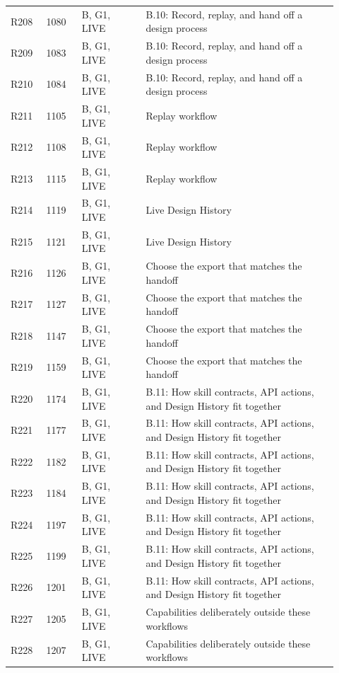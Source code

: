 \documentclass[11pt]{article}
\begin{document}
\begin{longtable}{@{}p{0.10\linewidth}p{0.10\linewidth}p{0.18\linewidth}p{0.54\linewidth}@{}}
R208 & 1080 & B, G1, LIVE & B.10: Record, replay, and hand off a design process \\
R209 & 1083 & B, G1, LIVE & B.10: Record, replay, and hand off a design process \\
R210 & 1084 & B, G1, LIVE & B.10: Record, replay, and hand off a design process \\
R211 & 1105 & B, G1, LIVE & Replay workflow \\
R212 & 1108 & B, G1, LIVE & Replay workflow \\
R213 & 1115 & B, G1, LIVE & Replay workflow \\
R214 & 1119 & B, G1, LIVE & Live Design History \\
R215 & 1121 & B, G1, LIVE & Live Design History \\
R216 & 1126 & B, G1, LIVE & Choose the export that matches the handoff \\
R217 & 1127 & B, G1, LIVE & Choose the export that matches the handoff \\
R218 & 1147 & B, G1, LIVE & Choose the export that matches the handoff \\
R219 & 1159 & B, G1, LIVE & Choose the export that matches the handoff \\
R220 & 1174 & B, G1, LIVE & B.11: How skill contracts, API actions, and Design History fit together \\
R221 & 1177 & B, G1, LIVE & B.11: How skill contracts, API actions, and Design History fit together \\
R222 & 1182 & B, G1, LIVE & B.11: How skill contracts, API actions, and Design History fit together \\
R223 & 1184 & B, G1, LIVE & B.11: How skill contracts, API actions, and Design History fit together \\
R224 & 1197 & B, G1, LIVE & B.11: How skill contracts, API actions, and Design History fit together \\
R225 & 1199 & B, G1, LIVE & B.11: How skill contracts, API actions, and Design History fit together \\
R226 & 1201 & B, G1, LIVE & B.11: How skill contracts, API actions, and Design History fit together \\
R227 & 1205 & B, G1, LIVE & Capabilities deliberately outside these workflows \\
R228 & 1207 & B, G1, LIVE & Capabilities deliberately outside these workflows \\
\bottomrule\end{longtable}
\end{document}

